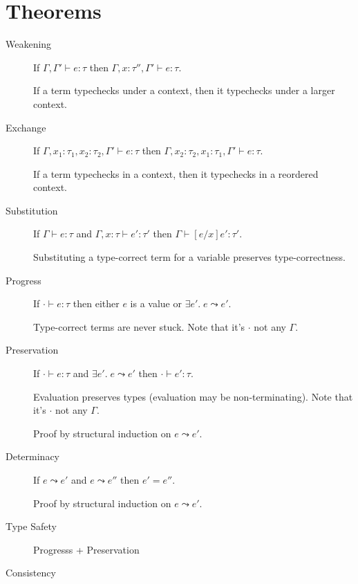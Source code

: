 \documentclass[11pt]{article}
\begin{document}
\section{Theorems}
{
    \begin{description}
    \item[Weakening]
    {
        \hfill

        If \(\Gamma,\Gamma' \vdash e : \tau\) then \(\Gamma, x : \tau'', \Gamma' \vdash e : \tau\).

        If a term typechecks under a context, then it typechecks under a larger context.
    }
    \item[Exchange]
    {
        \hfill

        If \(\Gamma, x_1 : \tau_1, x_2 : \tau_2, \Gamma' \vdash e : \tau\) then \(\Gamma, x_2 : \tau_2, x_1 : \tau_1,
        \Gamma' \vdash e : \tau\).

        If a term typechecks in a context, then it typechecks in a reordered context.

    }
    \item[Substitution]
    {
        \hfill
        
        If \(\Gamma \vdash e : \tau\) and \(\Gamma, x : \tau \vdash e' : \tau'\) then \(\Gamma \vdash [e/x]e' : \tau'\).

        Substituting a type-correct term for a variable preserves type-correctness.
    }
    \item[Progress]
    {
        \hfill

        If \(\cdot \vdash e : \tau\) then either \(e\) is a value or \(\exists e'.\; e \leadsto e'\).

        Type-correct terms are never stuck. Note that it's \(\cdot\) not any \(\Gamma\).
    }
    \item[Preservation]
    {
        \hfill

        If \(\cdot \vdash e : \tau\) and \(\exists e'.\; e \leadsto e'\) then \(\cdot \vdash e' : \tau\).

        Evaluation preserves types (evaluation may be non-terminating). Note that it's \(\cdot\) not any \(\Gamma\).

        Proof by structural induction on \(e \leadsto e'\).
    }
    \item[Determinacy]
    {
        \hfill

        If \(e \leadsto e'\) and \(e \leadsto e''\) then \(e' = e''\).
        
        Proof by structural induction on \(e \leadsto e'\).
    }
    \item[Type Safety] Progresss + Preservation
    \item[Consistency]
    {
        \hfill

}
\end{description}}
\end{document}
